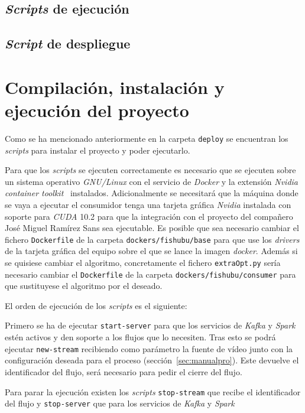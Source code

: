 \subsection{\textit{Scripts} de ejecución}

\subsection{\textit{Script} de despliegue}


\section{Compilación, instalación y ejecución del proyecto}

Como se ha mencionado anteriormente en la carpeta \texttt{deploy} se encuentran los \textit{scripts} para instalar el proyecto y poder ejecutarlo.

Para que los \textit{scripts} se ejecuten correctamente es necesario que se ejecuten sobre un sistema operativo \textit{GNU/Linux} con el servicio de \textit{Docker} y la extensión \textit{Nvidia container toolkit}~\cite{toolkitnvidiadocker} instalados. Adicionalmente se necesitará que la máquina donde se vaya a ejecutar el consumidor tenga una tarjeta gráfica \textit{Nvidia} instalada con soporte para \textit{CUDA} 10.2 para que la integración con el proyecto del compañero José Miguel Ramírez Sans sea ejecutable. Es posible que sea necesario cambiar el fichero \texttt{Dockerfile} de la carpeta \texttt{dockers/fishubu/base} para que use los \textit{drivers} de la tarjeta gráfica del equipo sobre el que se lance la imagen \textit{docker}. Además si se quisiese cambiar el algoritmo, concretamente el fichero \texttt{extraOpt.py} sería necesario cambiar el \texttt{Dockerfile} de la carpeta \texttt{dockers/fishubu/consumer} para que sustituyese el algoritmo por el deseado.

El orden de ejecución de los \textit{scripts} es el siguiente:

Primero se ha de ejecutar \texttt{start-server} para que los servicios de \textit{Kafka} y \textit{Spark} estén activos y den soporte a los flujos que lo necesiten. Tras esto se podrá ejecutar \texttt{new-stream} recibiendo como parámetro la fuente de vídeo junto con la configuración deseada para el proceso (sección~\ref{sec:manualpro}). Este devuelve el identificador del flujo, será necesario para pedir el cierre del flujo.

Para parar la ejecución existen los \textit{scripts} \texttt{stop-stream} que recibe el identificador del flujo y \texttt{stop-server} que para los servicios de \textit{Kafka} y \textit{Spark}
